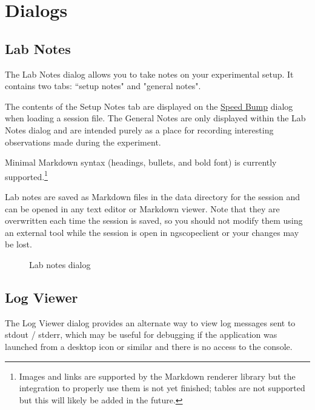 \chapter{Dialogs}
\label{sec:dialogs}


\section{Lab Notes}
\label{dlg:labnotes}

The Lab Notes dialog allows you to take notes on your experimental setup. It contains two tabs: ``setup notes"
and "general notes".

The contents of the Setup Notes tab are displayed on the \hyperref[dlg:speedbump]{Speed Bump} dialog when loading a
session file. The General Notes are only displayed within the Lab Notes dialog and are intended purely as a place for
recording interesting observations made during the experiment.

Minimal Markdown syntax (headings, bullets, and bold font) is currently supported.\footnote{Images and links are
supported by the Markdown renderer library but the integration to properly use them is not yet finished; tables are not
supported but this will likely be added in the future.}

Lab notes are saved as Markdown files in the data directory for the session and can be opened in any
text editor or Markdown viewer. Note that they are overwritten each time the session is saved, so you should not modify
them using an external tool while the session is open in ngscopeclient or your changes may be lost.

\begin{figure}[H]
\centering
{}
\caption{Lab notes dialog}
\label{fig:labnotes}
\end{figure}


\section{Log Viewer}
\label{dlg:logviewer}

The Log Viewer dialog provides an alternate way to view log messages sent to stdout / stderr, which may be useful for
debugging if the application was launched from a desktop icon or similar and there is no access to the console.

